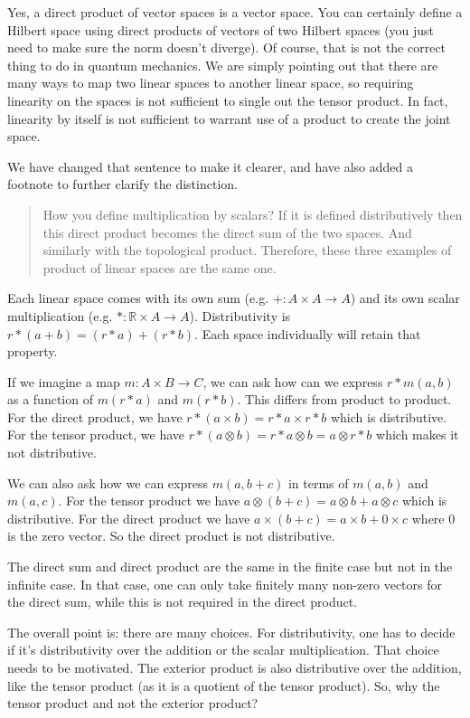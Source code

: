 \documentclass[11pt]{article}
\begin{document}
Yes, a direct product of vector spaces is a vector space. You can
certainly define a Hilbert space using direct products of vectors of
two Hilbert spaces (you just need to make sure the norm doesn't
diverge). Of course, that is not the correct thing to do in quantum
mechanics. We are simply pointing out that there are many ways to map
two linear spaces to another linear space, so requiring linearity on
the spaces is not sufficient to single out the tensor product. In
fact, linearity by itself is not sufficient to warrant use of a
product to create the joint space.

We have changed that sentence to make it clearer, and have also added
a footnote to further clarify the distinction.

\begin{quote}
How you define multiplication by scalars? If it is defined
distributively then this direct product becomes the direct sum of the
two spaces. And similarly with the topological product. Therefore,
these three examples of product of linear spaces are the same one.
\end{quote}

Each linear space comes with its own sum (e.g. $+ : A \times A \to A$)
and its own scalar multiplication (e.g. $* : \mathbb{R} \times A \to
A$). Distributivity is $r * (a + b) = (r*a) + (r*b)$. Each space
individually will retain that property.

If we imagine a map $m : A \times B \to C$, we can ask how can we
express $r*m(a,b)$ as a function of $m(r*a)$ and $m(r*b)$. This
differs from product to product. For the direct product, we have $r *
(a \times b) = r*a \times r*b$ which is distributive. For the tensor
product, we have $r * (a \otimes b) = r*a \otimes b = a \otimes r*b$
which makes it not distributive.

We can also ask how we can express $m(a,b+c)$ in terms of $m(a,b)$ and
$m(a,c)$. For the tensor product we have $a \otimes (b+c) = a \otimes
b + a \otimes c$ which is distributive. For the direct product we have
$a \times (b+c) = a \times b + 0 \times c$ where $0$ is the zero
vector. So the direct product is not distributive.

The direct sum and direct product are the same in the finite case but
not in the infinite case. In that case, one can only take finitely
many non-zero vectors for the direct sum, while this is not required
in the direct product.

The overall point is: there are many choices. For distributivity, one
has to decide if it's distributivity over the addition or the scalar
multiplication. That choice needs to be motivated. The exterior
product is also distributive over the addition, like the tensor
product (as it is a quotient of the tensor product). So, why the
tensor product and not the exterior product?
\end{document}
